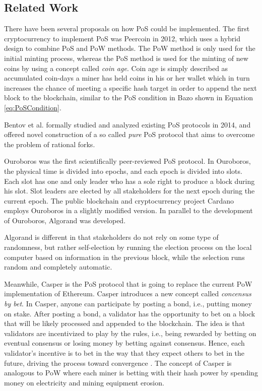 \documentclass[12pt,a4]{article}
\begin{document}
\subsection{Related Work} 

There have been several proposals on how PoS could be implemented. The first cryptocurrency to implement PoS was Peercoin \cite{King12} in 2012, which uses a hybrid design to combine PoS and PoW methods. The PoW method is only used for the initial minting process, whereas the PoS method is used for the minting of new coins by using a concept called \textit{coin age}. Coin age is simply described as accumulated coin-days a miner has held coins in his or her wallet which in turn increases the chance of meeting a specific hash target in order to append the next block to the blockchain, similar to the PoS condition in Bazo shown in Equation \ref{eq:PoSCondition}.

Bentov et al. \cite{Bentov14} formally studied and analyzed existing PoS protocols in 2014, and offered novel construction of a so called \textit{pure} PoS protocol that aims to overcome the problem of rational forks.

Ouroboros \cite{Kiayias17} was the first scientifically peer-reviewed PoS protocol. In Ouroboros, the physical time is divided into epochs, and each epoch is divided into slots. Each slot has one and only leader who has a sole right to produce a block during his slot. Slot leaders are elected by all stakeholders for the next epoch during the current epoch. The public blockchain and cryptocurrency project Cardano \cite{Cardano} employs Ouroboros in a slightly modified version. In parallel to the development of Ouroboros, Algorand \cite{Gilad17} was developed. 

Algorand is different in that stakeholders do not rely on some type of randomness, but rather self-election by running the election process on the local computer based on information in the previous block, while the selection runs random and completely automatic.

Meanwhile, Casper \cite{ButerinPOS16} is the PoS protocol that is going to replace the current PoW implementation of Ethereum. Casper introduces a new concept called \textit{concensus by bet}. In Casper, anyone can participate by posting a bond, i.e., putting money on stake. After posting a bond, a validator has the opportunity to bet on a block that will be likely processed and appended to the blockchain. The idea is that validators are incentivized to play by the rules, i.e., being rewarded by betting on eventual consensus or losing money by betting against consensus. Hence, each validator's incentive is to bet in the way that they expect others to bet in the future, driving the process toward convergence \cite{Zamfir15}. The concept of Casper is analogous to PoW where each miner is betting with their hash power by spending money on electricity and mining equipment erosion. 
\end{document}

